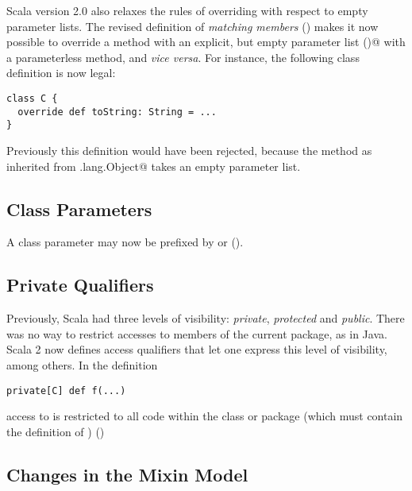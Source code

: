 Scala version 2.0 also relaxes the rules of overriding with respect to
empty parameter lists. The revised definition of {\em matching
members} () makes it now possible to override a
method with an explicit, but empty parameter list \lstinline@()@ with
a parameterless method, and {\em vice versa}. For instance, 
the following class definition is now legal:
\begin{lstlisting}
class C {
  override def toString: String = ...
}
\end{lstlisting}
Previously this definition would have been rejected, because the
\lstinline@toString@ method as inherited from
\lstinline@java.lang.Object@ takes an empty parameter list.  

\subsection*{Class Parameters}

A class parameter may now be prefixed by \lstinline@val@ or
\lstinline@var@ (). 

\subsection*{Private Qualifiers}

Previously, Scala had three levels of visibility: {\em private},
{\em protected} and {\em public}. There was no way to
restrict accesses to members of the current package, as in Java. Scala
2 now defines access qualifiers that let one express this level of
visibility, among others. In the definition
\begin{lstlisting}
private[C] def f(...)
\end{lstlisting}
access to \lstinline@f@ is restricted to all code within the class or
package \lstinline@C@ (which must contain the definition of
\lstinline@f@) ()

\subsection*{Changes in the Mixin Model}\label{sec:mixin-classes}

